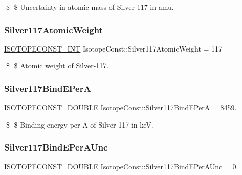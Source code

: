 \$ \$ Uncertainty in atomic mass of Silver-\/117 in amu. \mbox{\label{group___isotope_const-_silver-_ag117_gab2b041732c11eeafd19e74a01cdc0497}} 
\subsubsection{\texorpdfstring{Silver117\+Atomic\+Weight}{Silver117AtomicWeight}}
{\footnotesize\ttfamily \mbox{\hyperlink{group___isotope_const-_macros_ga5f18360b3e99483a35c32d789e62621c}{I\+S\+O\+T\+O\+P\+E\+C\+O\+N\+S\+T\+\_\+\+I\+NT}} Isotope\+Const\+::\+Silver117\+Atomic\+Weight = 117}

\$ \$ Atomic weight of Silver-\/117. \mbox{\label{group___isotope_const-_silver-_ag117_ga0c9270baefeeee8f7f6b924771272193}} 
\subsubsection{\texorpdfstring{Silver117\+Bind\+E\+PerA}{Silver117BindEPerA}}
{\footnotesize\ttfamily \mbox{\hyperlink{group___isotope_const-_macros_ga8f45a7272ce02c0b4c65c44636ed719a}{I\+S\+O\+T\+O\+P\+E\+C\+O\+N\+S\+T\+\_\+\+D\+O\+U\+B\+LE}} Isotope\+Const\+::\+Silver117\+Bind\+E\+PerA = 8459.}

\$ \$ Binding energy per A of Silver-\/117 in keV. \mbox{\label{group___isotope_const-_silver-_ag117_ga7ec80b9c8200dc06a746eff6fad01e05}} 
\subsubsection{\texorpdfstring{Silver117\+Bind\+E\+Per\+A\+Unc}{Silver117BindEPerAUnc}}
{\footnotesize\ttfamily \mbox{\hyperlink{group___isotope_const-_macros_ga8f45a7272ce02c0b4c65c44636ed719a}{I\+S\+O\+T\+O\+P\+E\+C\+O\+N\+S\+T\+\_\+\+D\+O\+U\+B\+LE}} Isotope\+Const\+::\+Silver117\+Bind\+E\+Per\+A\+Unc = 0.}

